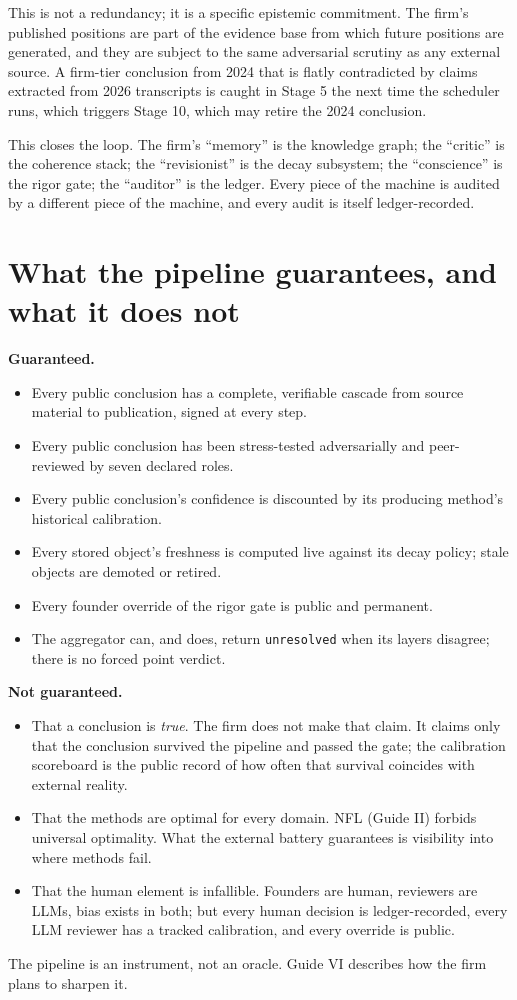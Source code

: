\documentclass[11pt,letterpaper]{article}
\begin{document}
This is not a redundancy; it is a specific epistemic commitment. The firm's published positions are part of the evidence base from which future positions are generated, and they are subject to the same adversarial scrutiny as any external source. A firm-tier conclusion from 2024 that is flatly contradicted by claims extracted from 2026 transcripts is caught in Stage 5 the next time the scheduler runs, which triggers Stage 10, which may retire the 2024 conclusion.

This closes the loop. The firm's ``memory'' is the knowledge graph; the ``critic'' is the coherence stack; the ``revisionist'' is the decay subsystem; the ``conscience'' is the rigor gate; the ``auditor'' is the ledger. Every piece of the machine is audited by a different piece of the machine, and every audit is itself ledger-recorded.

\section{What the pipeline guarantees, and what it does not}

\textbf{Guaranteed.}
\begin{itemize}[leftmargin=1.5em,itemsep=0.1em]
\item Every public conclusion has a complete, verifiable cascade from source material to publication, signed at every step.
\item Every public conclusion has been stress-tested adversarially and peer-reviewed by seven declared roles.
\item Every public conclusion's confidence is discounted by its producing method's historical calibration.
\item Every stored object's freshness is computed live against its decay policy; stale objects are demoted or retired.
\item Every founder override of the rigor gate is public and permanent.
\item The aggregator can, and does, return \texttt{unresolved} when its layers disagree; there is no forced point verdict.
\end{itemize}

\textbf{Not guaranteed.}
\begin{itemize}[leftmargin=1.5em,itemsep=0.1em]
\item That a conclusion is \emph{true}. The firm does not make that claim. It claims only that the conclusion survived the pipeline and passed the gate; the calibration scoreboard is the public record of how often that survival coincides with external reality.
\item That the methods are optimal for every domain. NFL (Guide II) forbids universal optimality. What the external battery guarantees is visibility into where methods fail.
\item That the human element is infallible. Founders are human, reviewers are LLMs, bias exists in both; but every human decision is ledger-recorded, every LLM reviewer has a tracked calibration, and every override is public.
\end{itemize}

The pipeline is an instrument, not an oracle. Guide VI describes how the firm plans to sharpen it.
\end{document}
